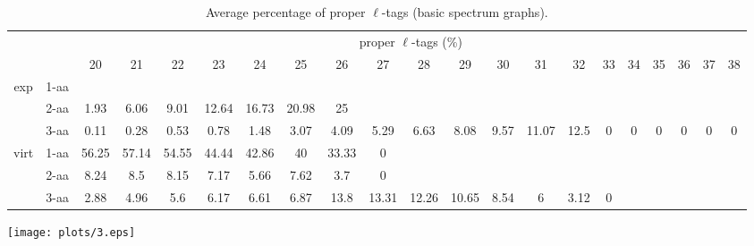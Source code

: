 \documentclass{article}
\begin{document}
\begin{table}[h]\tiny
\vspace{3mm}
{\centering
\begin{center}
\begin{tabular}{|c|l|c|c|c|c|c|c|c|c|c|c|c|c|c|c|c|c|c|c|c|}
  \hline
  \multicolumn{2}{|c|}{ } & \multicolumn{ 19 }{|c|}{ proper $\ell$-tags (\%)} \\
  \cline{3- 21}
  \multicolumn{2}{|c|}{ }  & 20 & 21 & 22 & 23 & 24 & 25 & 26 & 27 & 28 & 29 & 30 & 31 & 32 & 33 & 34 & 35 & 36 & 37 & 38\\
  \hline
  \multirow{3}{*}{exp}
&  1-aa  &  &  &  &  &  &  &  &  &  &  &  &  &  &  &  &  &  &  & \\&  2-aa  & 1.93 & 6.06 & 9.01 & 12.64 & 16.73 & 20.98 & 25 &  &  &  &  &  &  &  &  &  &  &  & \\&  3-aa  & 0.11 & 0.28 & 0.53 & 0.78 & 1.48 & 3.07 & 4.09 & 5.29 & 6.63 & 8.08 & 9.57 & 11.07 & 12.5 & 0 & 0 & 0 & 0 & 0 & 0\\ \hline
  \multirow{3}{*}{virt} 
&  1-aa  & 56.25 & 57.14 & 54.55 & 44.44 & 42.86 & 40 & 33.33 & 0 &  &  &  &  &  &  &  &  &  &  & \\&  2-aa  & 8.24 & 8.5 & 8.15 & 7.17 & 5.66 & 7.62 & 3.7 & 0 &  &  &  &  &  &  &  &  &  &  & \\&  3-aa  & 2.88 & 4.96 & 5.6 & 6.17 & 6.61 & 6.87 & 13.8 & 13.31 & 12.26 & 10.65 & 8.54 & 6 & 3.12 & 0 &  &  &  &  & \\ \hline
\end{tabular}
\end{center}
\par}
\centering
\caption{ Average percentage of proper $\ell$-tags (basic spectrum graphs).}
\vspace{3mm}
\label{table:table2}
\end{table}


\texttt{[image: plots/3.eps]}
\end{document}
